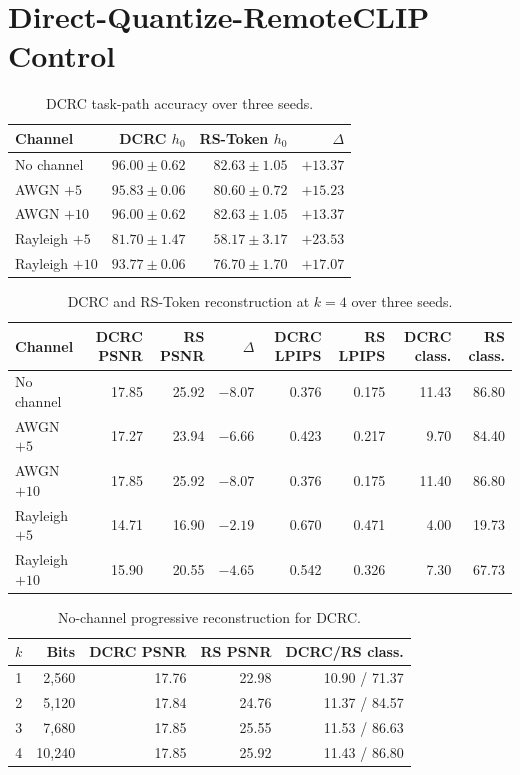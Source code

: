 \documentclass[letterpaper,journal]{IEEEtran}
\begin{document}
\FloatBarrier

\section{Direct-Quantize-RemoteCLIP Control}
\label{app:dcrc}

\begin{table}[!t]
\centering
\caption{DCRC task-path accuracy over three seeds.}
\scriptsize
\begin{tabular}{@{}lrrr@{}}
\toprule
Channel & DCRC $h_0$ & RS-Token $h_0$ & $\Delta$ \\ \midrule
No channel & $96.00\pm0.62$ & $82.63\pm1.05$ & $+13.37$ \\
AWGN $+5$ & $95.83\pm0.06$ & $80.60\pm0.72$ & $+15.23$ \\
AWGN $+10$ & $96.00\pm0.62$ & $82.63\pm1.05$ & $+13.37$ \\
Rayleigh $+5$ & $81.70\pm1.47$ & $58.17\pm3.17$ & $+23.53$ \\
Rayleigh $+10$ & $93.77\pm0.06$ & $76.70\pm1.70$ & $+17.07$ \\ \bottomrule
\end{tabular}
\end{table}

\begin{table}[!t]
\centering
\caption{DCRC and RS-Token reconstruction at $k=4$ over three seeds.}
\scriptsize
\setlength{\tabcolsep}{2.8pt}
\begin{tabular}{@{}lrrrrrrr@{}}
\toprule
Channel & DCRC PSNR & RS PSNR & $\Delta$ & DCRC LPIPS & RS LPIPS & DCRC class. & RS class. \\ \midrule
No channel & 17.85 & 25.92 & $-8.07$ & 0.376 & 0.175 & 11.43 & 86.80 \\
AWGN $+5$ & 17.27 & 23.94 & $-6.66$ & 0.423 & 0.217 & 9.70 & 84.40 \\
AWGN $+10$ & 17.85 & 25.92 & $-8.07$ & 0.376 & 0.175 & 11.40 & 86.80 \\
Rayleigh $+5$ & 14.71 & 16.90 & $-2.19$ & 0.670 & 0.471 & 4.00 & 19.73 \\
Rayleigh $+10$ & 15.90 & 20.55 & $-4.65$ & 0.542 & 0.326 & 7.30 & 67.73 \\ \bottomrule
\end{tabular}
\end{table}

\begin{table}[!t]
\centering
\caption{No-channel progressive reconstruction for DCRC.}
\scriptsize
\begin{tabular}{@{}rrrrr@{}}
\toprule
$k$ & Bits & DCRC PSNR & RS PSNR & DCRC/RS class. \\ \midrule
1 & 2,560 & 17.76 & 22.98 & 10.90 / 71.37 \\
2 & 5,120 & 17.84 & 24.76 & 11.37 / 84.57 \\
3 & 7,680 & 17.85 & 25.55 & 11.53 / 86.63 \\
4 & 10,240 & 17.85 & 25.92 & 11.43 / 86.80 \\ \bottomrule
\end{tabular}
\end{table}
\end{document}
